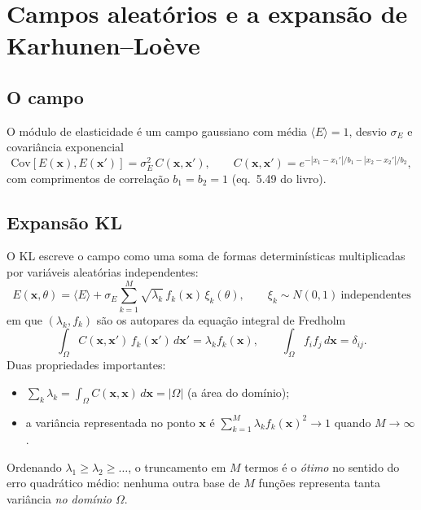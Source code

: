 \documentclass[11pt,a4paper]{article}
\newcommand{\bx}{\bm{x}}
\begin{document}
\section{Campos aleatórios e a expansão de Karhunen--Loève}\label{sec:kl}
\subsection{O campo}
O módulo de elasticidade é um campo gaussiano com média $\langle E\rangle=1$, desvio $\sigma_E$ e covariância exponencial
\begin{equation}
  \mathrm{Cov}[E(\bx),E(\bx')]=\sigma_E^2\,C(\bx,\bx'),\qquad
  C(\bx,\bx')=e^{-|x_1-x_1'|/b_1-|x_2-x_2'|/b_2},
\end{equation}
com comprimentos de correlação $b_1=b_2=1$ (eq.~5.49 do livro).

\subsection{Expansão KL}
O KL escreve o campo como uma soma de formas determinísticas multiplicadas por variáveis aleatórias independentes:
\begin{equation}\label{eq:kl}
  \boxed{E(\bx,\theta)=\langle E\rangle+\sigma_E\sum_{k=1}^{M}\sqrt{\lambda_k}\,f_k(\bx)\,\xi_k(\theta),\qquad \xi_k\sim N(0,1)\ \text{independentes}}
\end{equation}
em que $(\lambda_k,f_k)$ são os autopares da equação integral de Fredholm
\begin{equation}\label{eq:fredholm}
  \int_{\Omega}C(\bx,\bx')\,f_k(\bx')\,d\bx'=\lambda_k f_k(\bx),\qquad
  \int_\Omega f_i f_j\,d\bx=\delta_{ij}.
\end{equation}
Duas propriedades importantes:
\begin{itemize}
  \item $\sum_k\lambda_k=\int_\Omega C(\bx,\bx)\,d\bx=|\Omega|$ (a área do domínio);
  \item a variância representada no ponto $\bx$ é $\sum_{k=1}^{M}\lambda_k f_k(\bx)^2\to1$ quando $M\to\infty$.
\end{itemize}
Ordenando $\lambda_1\ge\lambda_2\ge\dots$, o truncamento em $M$ termos é o \emph{ótimo} no sentido do erro quadrático médio: nenhuma outra base de $M$ funções representa tanta variância \emph{no domínio $\Omega$}.
\end{document}
